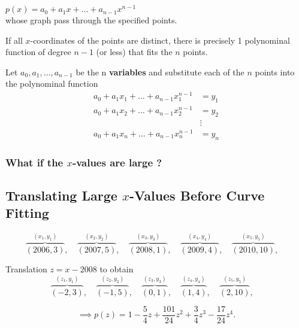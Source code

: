 \documentclass{article}
\begin{document}
    \quad $p(x) = a_0 + a_1x + \dots + a_{n-1}x^{n-1}$\\
    whose graph pass through the specified points.

    If all $x$-coordinates of the points are distinct, there is precisely 1 polynominal function
    of degree $n - 1$ (or less) that fits the $n$ points.

    Let $a_0, a_1, \dots, a_{n-1}$ be the n \textbf{variables} and substitute each of the $n$ points into the polynominal
    function 
    \begin{equation*}
        \begin{split}
            a_0 + a_1x_1 + \dots + a_{n-1}x_1^{n-1} & = y_1\\
            a_0 + a_1x_2 + \dots + a_{n-1}x_2^{n-1} & = y_2\\
       &   \vdots \\
            a_0 + a_1x_n + \dots + a_{n-1}x_n^{n-1} & =  y_n
        \end{split}
    \end{equation*}

    \subsubsection*{What if the $x$-values are large ?}

    \subsection*{Translating Large $x$-Values Before Curve Fitting}

    \begin{equation*}
        \overbrace{(2006, 3)}^{(x_1,y_1)}, \quad
        \overbrace{(2007, 5)}^{(x_2, y_2)}, \quad
        \overbrace{(2008, 1)}^{(x_3, y_3)}, \quad
        \overbrace{(2009, 4)}^{(x_4, y_4)}, \quad
        \overbrace{(2010, 10)}^{(x_5, y_5)}, \quad
    \end{equation*}
    
    Translation $z = x - 2008$ to obtain
    \begin{equation*}
        \overbrace{(-2, 3)}^{(z_1,y_1)}, \quad
        \overbrace{(-1, 5)}^{(z_2, y_2)}, \quad
        \overbrace{(0, 1)}^{(z_3, y_3)}, \quad
        \overbrace{(1, 4)}^{(z_4, y_4)}, \quad
        \overbrace{(2, 10)}^{(z_5, y_5)}, \quad
    \end{equation*}

    \[ \implies p(z) = 1 - \frac{5}{4}z  + \frac{101}{24}z^2 + \frac{3}{4}z^3 - \frac{17}{24}z^4.\]
\end{document}
